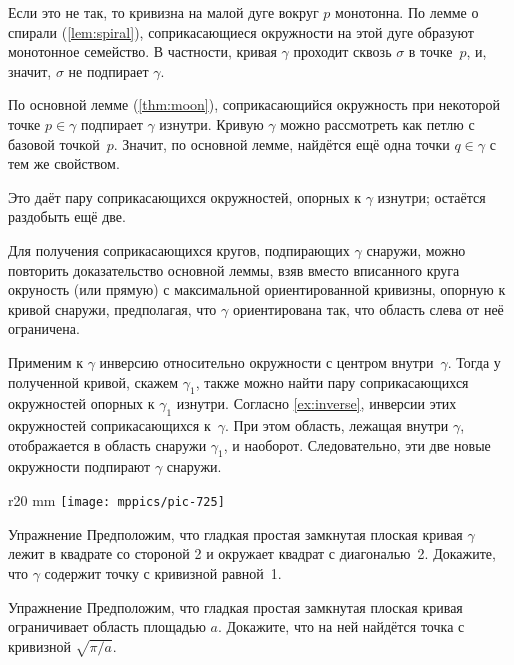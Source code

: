 Если это не так, то кривизна на малой дуге вокруг $p$ монотонна.
По лемме о спирали (\ref{lem:spiral}), соприкасающиеся окружности на этой дуге образуют монотонное семейство.
В частности, кривая $\gamma$ проходит сквозь $\sigma$ в точке~$p$, и, значит, $\sigma$ не подпирает $\gamma$.
\qeds

По основной лемме (\ref{thm:moon}), соприкасающийся окружность при некоторой точке $p\in\gamma$ подпирает $\gamma$ изнутри.
Кривую $\gamma$ можно рассмотреть как петлю с базовой точкой~$p$.
Значит, по основной лемме, найдётся ещё одна точки $q\in\gamma$ с тем же свойством.

Это даёт пару соприкасающихся окружностей, опорных к $\gamma$ изнутри;
остаётся раздобыть ещё две.

Для получения соприкасающихся кругов, подпирающих $\gamma$ снаружи, можно повторить доказательство основной леммы, взяв вместо вписанного круга окруность (или прямую) с максимальной ориентированной кривизны, опорную к кривой снаружи, предполагая, что $\gamma$ ориентирована так, что область слева от неё ограничена.\qeds

 Применим к $\gamma$ инверсию относительно окружности с центром внутри~$\gamma$. Тогда у полученной кривой, скажем $\gamma_1$, также можно найти пару соприкасающихся окружностей опорных к $\gamma_1$ изнутри.
Согласно \ref{ex:inverse}, инверсии этих окружностей соприкасающихся к~$\gamma$.
При этом область, лежащая внутри $\gamma$, отображается в область снаружи $\gamma_1$, и наоборот.
Следовательно, эти две новые окружности подпирают $\gamma$ снаружи.\qeds


{

\begin{wrapfigure}{r}{20 mm}
\vskip-0mm
\centering
\texttt{[image: mppics/pic-725]}
\vskip0mm
\end{wrapfigure}

\begin{thm}{Упражнение}\label{ex:2-squares}
Предположим, что гладкая простая замкнутая плоская кривая \(\gamma\) лежит в квадрате со стороной 2 и окружает квадрат с диагональю~2.
Докажите, что \(\gamma\) содержит точку с кривизной равной~1.
\end{thm}

}

\begin{thm}{Упражнение}\label{ex:moon-area}
Предположим, что гладкая простая замкнутая плоская кривая ограничивает область площадью $a$.
Докажите, что на ней найдётся точка с кривизной $\sqrt{\pi/a}$.
\end{thm}


